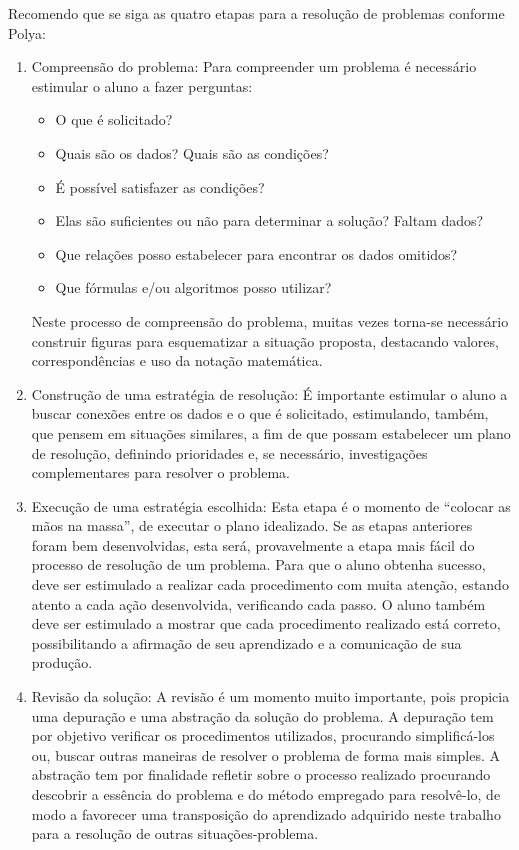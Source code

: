 Recomendo que se siga as quatro etapas para a resolução de problemas conforme Polya:
\begin{enumerate}
\item Compreensão do problema: Para compreender um problema é necessário estimular o aluno a fazer perguntas:
\begin{itemize}
\item O que é
solicitado? 
\item Quais são os dados? Quais são as condições? 
\item É possível satisfazer as condições?
\item 
Elas são suficientes ou não para determinar a solução? Faltam dados? 
\item Que relações posso
estabelecer para encontrar os dados omitidos? 
\item Que fórmulas e/ou algoritmos posso utilizar?
\end{itemize}
Neste processo de compreensão do problema, muitas vezes torna-se necessário construir
figuras para esquematizar a situação proposta, destacando valores, correspondências e uso da
notação matemática.

\item Construção de uma estratégia de resolução: É importante estimular o aluno a buscar conexões entre os dados e o que é solicitado, estimulando, também, que pensem em situações similares, a fim de que possam estabelecer um plano de resolução, definindo prioridades e, se necessário, investigações complementares
para resolver o problema.

\item Execução de uma estratégia escolhida: Esta etapa é o momento de “colocar as mãos na massa”, de executar o plano idealizado. Se as etapas anteriores foram bem desenvolvidas, esta será, provavelmente a etapa mais fácil do processo de resolução de um problema. Para que o aluno obtenha sucesso, deve ser estimulado a realizar cada procedimento com muita atenção, estando atento a cada ação desenvolvida, verificando cada passo. O aluno também deve ser estimulado a mostrar que cada procedimento realizado está correto, possibilitando a afirmação de seu aprendizado e a comunicação de sua produção.

\item Revisão da solução: A revisão é um momento muito importante, pois propicia uma depuração e uma abstração da solução do problema. A depuração tem por objetivo verificar os procedimentos utilizados, procurando simplificá-los ou, buscar outras maneiras de resolver o problema de forma mais simples. A abstração tem por finalidade refletir sobre o processo realizado procurando descobrir a essência do problema e do método empregado para resolvê-lo, de modo a favorecer uma transposição do aprendizado adquirido neste trabalho para a resolução de
outras situações-problema.
\end{enumerate}





